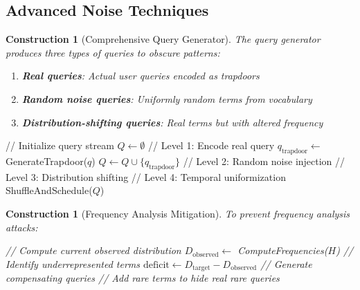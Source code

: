 \documentclass[11pt,final]{article}
\newtheorem{construction}[theorem]{Construction}
\begin{document}
\subsection{Advanced Noise Techniques}

\begin{construction}[Comprehensive Query Generator]
The query generator produces three types of queries to obscure patterns:
\begin{enumerate}
    \item \textbf{Real queries}: Actual user queries encoded as trapdoors
    \item \textbf{Random noise queries}: Uniformly random terms from vocabulary
    \item \textbf{Distribution-shifting queries}: Real terms but with altered frequency
\end{enumerate}
\end{construction}

\begin{algorithm}[H]
\caption{Advanced Query Generator with Multiple Strategies}
// Initialize query stream\;
$Q \gets \emptyset$\;
// Level 1: Encode real query\;
$q_{\text{trapdoor}} \gets$ GenerateTrapdoor($q$)\;
$Q \gets Q \cup \{q_{\text{trapdoor}}\}$\;
// Level 2: Random noise injection\;
// Level 3: Distribution shifting\;
// Level 4: Temporal uniformization\;
ShuffleAndSchedule($Q$)\;
\end{algorithm}

\begin{construction}[Frequency Analysis Mitigation]
To prevent frequency analysis attacks:
\begin{algorithm}[H]
\caption{Distribution-Flattening Query Generator}
// Compute current observed distribution\;
$D_{\text{observed}} \gets$ ComputeFrequencies($H$)\;
// Identify underrepresented terms\;
$\text{deficit} \gets D_{\text{target}} - D_{\text{observed}}$\;
// Generate compensating queries\;
// Add rare terms to hide real rare queries\;
\end{algorithm}
\end{construction}
\end{document}
